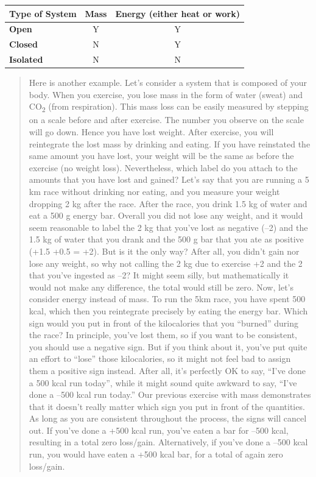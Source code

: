 \documentclass[
  9pt,
]{extbook}
\theoremstyle{definition}
\theoremstyle{definition}
\theoremstyle{definition}
\theoremstyle{remark}
\begin{document}
\begin{longtable}[]{@{}lcc@{}}
\toprule
\textbf{Type of System} & \textbf{Mass} & \textbf{Energy} (either heat or work)\tabularnewline
\midrule
\endhead
\textbf{Open} & Y & Y\tabularnewline
\textbf{Closed} & N & Y\tabularnewline
\textbf{Isolated} & N & N\tabularnewline
\bottomrule
\end{longtable}

\begin{quote}
Here is another example. Let's consider a system that is composed of your body. When you exercise, you lose mass in the form of water (sweat) and CO\textsubscript{2} (from respiration). This mass loss can be easily measured by stepping on a scale before and after exercise. The number you observe on the scale will go down. Hence you have lost weight. After exercise, you will reintegrate the lost mass by drinking and eating. If you have reinstated the same amount you have lost, your weight will be the same as before the exercise (no weight loss). Nevertheless, which label do you attach to the amounts that you have lost and gained? Let's say that you are running a 5 km race without drinking nor eating, and you measure your weight dropping 2 kg after the race. After the race, you drink 1.5 kg of water and eat a 500 g energy bar. Overall you did not lose any weight, and it would seem reasonable to label the 2 kg that you've lost as negative (--2) and the 1.5 kg of water that you drank and the 500 g bar that you ate as positive (+1.5 +0.5 = +2). But is it the only way? After all, you didn't gain nor lose any weight, so why not calling the 2 kg due to exercise +2 and the 2 that you've ingested as --2? It might seem silly, but mathematically it would not make any difference, the total would still be zero. Now, let's consider energy instead of mass. To run the 5km race, you have spent 500 kcal, which then you reintegrate precisely by eating the energy bar. Which sign would you put in front of the kilocalories that you ``burned'' during the race? In principle, you've lost them, so if you want to be consistent, you should use a negative sign. But if you think about it, you've put quite an effort to ``lose'' those kilocalories, so it might not feel bad to assign them a positive sign instead. After all, it's perfectly OK to say, ``I've done a 500 kcal run today'', while it might sound quite awkward to say, ``I've done a --500 kcal run today.'' Our previous exercise with mass demonstrates that it doesn't really matter which sign you put in front of the quantities. As long as you are consistent throughout the process, the signs will cancel out. If you've done a +500 kcal run, you've eaten a bar for --500 kcal, resulting in a total zero loss/gain. Alternatively, if you've done a --500 kcal run, you would have eaten a +500 kcal bar, for a total of again zero loss/gain.
\end{quote}
\end{document}
